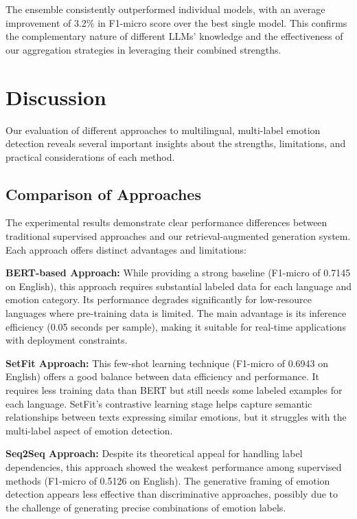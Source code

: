 \documentclass[a4paper,12pt]{extarticle}
\begin{document}
The ensemble consistently outperformed individual models, with an average improvement of 3.2\% in F1-micro score over the best single model. This confirms the complementary nature of different LLMs' knowledge and the effectiveness of our aggregation strategies in leveraging their combined strengths.

\section{Discussion}

Our evaluation of different approaches to multilingual, multi-label emotion detection reveals several important insights about the strengths, limitations, and practical considerations of each method.

\subsection{Comparison of Approaches}

The experimental results demonstrate clear performance differences between traditional supervised approaches and our retrieval-augmented generation system. Each approach offers distinct advantages and limitations:

\textbf{BERT-based Approach:} While providing a strong baseline (F1-micro of 0.7145 on English), this approach requires substantial labeled data for each language and emotion category. Its performance degrades significantly for low-resource languages where pre-training data is limited. The main advantage is its inference efficiency (0.05 seconds per sample), making it suitable for real-time applications with deployment constraints.

\textbf{SetFit Approach:} This few-shot learning technique (F1-micro of 0.6943 on English) offers a good balance between data efficiency and performance. It requires less training data than BERT but still needs some labeled examples for each language. SetFit's contrastive learning stage helps capture semantic relationships between texts expressing similar emotions, but it struggles with the multi-label aspect of emotion detection.

\textbf{Seq2Seq Approach:} Despite its theoretical appeal for handling label dependencies, this approach showed the weakest performance among supervised methods (F1-micro of 0.5126 on English). The generative framing of emotion detection appears less effective than discriminative approaches, possibly due to the challenge of generating precise combinations of emotion labels.
\end{document}
